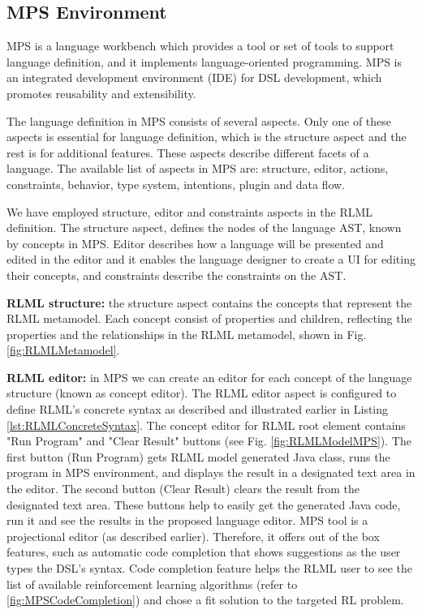 \documentclass[11pt,letterpaper]{ryersonSGSThesis}
\begin{document}
\begin{ryersonSGSThesis}
    \section{MPS Environment}
    \label{sec:MPS Environment}
        MPS \cite{MPS} is a language workbench which provides a tool or set of tools to support language definition, and it implements language-oriented programming. MPS is an integrated development environment (IDE) for DSL development, which promotes reusability and extensibility.
        
        The language definition in MPS consists of several aspects. Only one of these aspects is essential for language definition, which is the structure aspect and the rest is for additional features. These aspects describe different facets of a language. The available list of aspects in MPS are: structure, editor, actions, constraints, behavior, type system, intentions, plugin and data flow.
        
        We have employed structure, editor and constraints aspects in the RLML definition. The structure aspect, defines the nodes of the language AST, known by concepts in MPS. Editor describes how a language will be presented and edited in the editor and it enables the language designer to create a UI for editing their concepts, and constraints describe the constraints on the AST.
        
        \textbf{RLML structure:} the structure aspect contains the concepts that represent the RLML metamodel. Each concept consist of properties and children, reflecting the properties and the relationships in the RLML metamodel, shown in Fig. \ref{fig:RLMLMetamodel}.
        
        \textbf{RLML editor:} in MPS we can create an editor for each concept of the language structure (known as concept editor). The RLML editor aspect is configured to define RLML's concrete syntax as described and illustrated earlier in Listing \ref{lst:RLMLConcreteSyntax}. The concept editor for RLML root element contains "Run Program" and "Clear Result" buttons (see Fig. \ref{fig:RLMLModelMPS}). The first button (Run Program) gets RLML model generated Java class, runs the program in MPS environment, and displays the result in a designated text area in the editor. The second button (Clear Result) clears the result from the designated text area. These buttons help to easily get the generated Java code, run it and see the results in the proposed language editor.
        MPS tool is a projectional editor (as described earlier). Therefore, it offers out of the box features, such as automatic code completion that shows suggestions as the user types the DSL's syntax. Code completion feature helps the RLML user to see the list of available reinforcement learning algorithms (refer to \ref{fig:MPSCodeCompletion}) and chose a fit solution to the targeted RL problem.
        

\end{ryersonSGSThesis}
\end{document}
